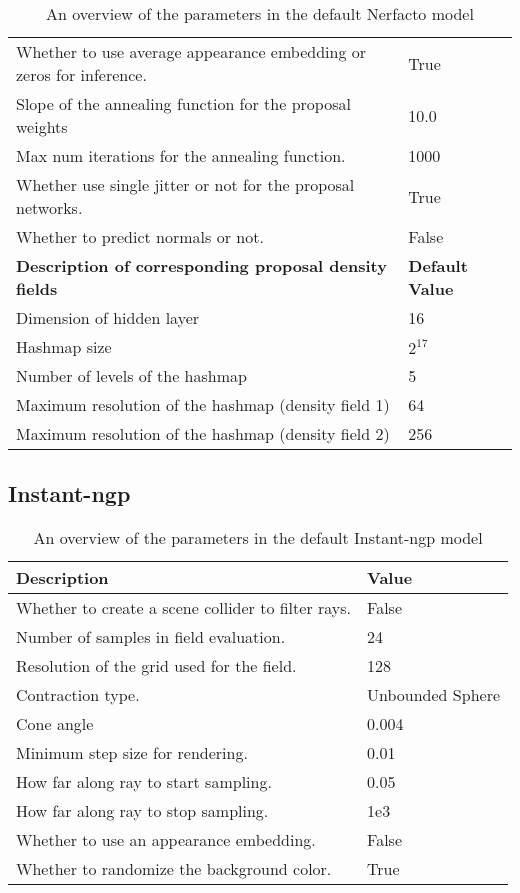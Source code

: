 \begin{table}[H]
\begin{tabular}{|l|l|}
    Whether to use average appearance embedding or zeros for inference. & True \\
    Slope of the annealing function for the proposal weights & 10.0 \\
    Max num iterations for the annealing function.          & 1000 \\
    Whether use single jitter or not for the proposal networks. & True \\
    Whether to predict normals or not.                      & False \\
    \midrule\midrule
    \textbf{Description of corresponding proposal density fields}    & \textbf{Default Value} \\
    \hline
    Dimension of hidden layer           & 16 \\
    Hashmap size                        & $2^{17}$ \\
    Number of levels of the hashmap     & 5 \\
    Maximum resolution of the hashmap (density field 1)         & 64 \\
    Maximum resolution of the hashmap (density field 2)         & 256 \\
    \hline
    \end{tabular}
    \caption{An overview of the parameters in the default Nerfacto model}
    \label{tab:nerfacto-parameter-overview}
\end{table}

\subsection{Instant-ngp}
\begin{table}[H]
    \centering
    \begin{tabular}{|l|l|}
    \hline
    \textbf{Description} & \textbf{Value} \\ 
    \hline
    Whether to create a scene collider to filter rays. & False \\
    Number of samples in field evaluation. & 24 \\
    Resolution of the grid used for the field. & 128 \\
    Contraction type. & Unbounded Sphere \\
    Cone angle & 0.004 \\
    Minimum step size for rendering. & 0.01 \\
    How far along ray to start sampling. & 0.05 \\
    How far along ray to stop sampling. & 1e3 \\
    Whether to use an appearance embedding. & False \\
    Whether to randomize the background color. & True \\ \hline
    \end{tabular}
    \caption{An overview of the parameters in the default Instant-ngp model}
    \label{tab:instant-ngp-parameter-overview}
\end{table}

